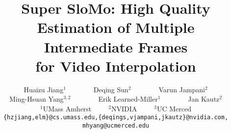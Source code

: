 \documentclass[10pt,twocolumn,letterpaper]{article}
\begin{document}
\title{Super SloMo: High Quality Estimation of Multiple Intermediate Frames \\for  Video Interpolation}


\author{
Huaizu Jiang$^1$~~~~~~~~Deqing Sun$^2$~~~~~~~~Varun Jampani$^2$\\
Ming-Hsuan Yang$^{3,2}$~~~~~~~~Erik Learned-Miller$^1$~~~~~~~~Jan Kautz$^2$\\
$^1$UMass Amherst~~~~~$^2$NVIDIA~~~~~$^3$UC Merced\\
{\tt\small \{hzjiang,elm\}@cs.umass.edu,\{deqings,vjampani,jkautz\}@nvidia.com, mhyang@ucmerced.edu}
}

\maketitle
\end{document}

